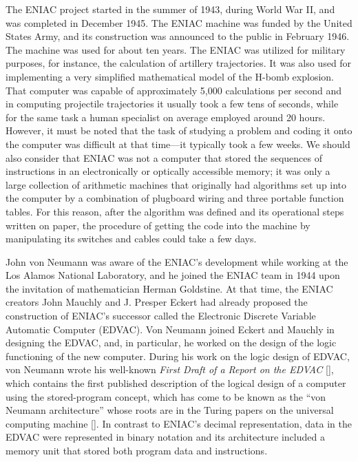 The ENIAC project started in the summer of 1943, during World War II, and was completed in December 1945. The ENIAC machine was funded by the United States Army, and its construction was announced to the public in February 1946. The machine was used for about ten years. The ENIAC was utilized for military purposes, for instance, the calculation of artillery trajectories. It was also used for implementing a very simplified mathematical model of the H-bomb explosion. That computer was capable of approximately 5,000 calculations per second and in computing projectile trajectories it usually took a few tens of seconds, while for the same task a human specialist on average employed around 20 hours. However, it must be noted that the task of studying a problem and coding it onto the computer was difficult at that time---it typically took a few weeks. We should also consider that ENIAC was not a computer that stored the sequences of instructions in an electronically or optically accessible memory; it was only a large collection of arithmetic machines that originally had algorithms set up into the computer by a combination of plugboard wiring and three portable function tables. For this reason, after the algorithm was defined and its operational steps written on paper, the procedure of getting the code into the machine by manipulating its switches and cables could take a few days.

John von Neumann was aware of the ENIAC's development while working at the Los Alamos National Laboratory, and he joined the ENIAC team in 1944 upon the invitation of mathematician Herman Goldstine. At that time, the ENIAC creators John Mauchly and J. Presper Eckert had already proposed the construction of ENIAC's successor called the Electronic Discrete Variable Automatic Computer (EDVAC). Von Neumann joined Eckert and Mauchly in designing the EDVAC, and, in particular, he worked on the design of the logic functioning of the new computer. During his work on the logic design of EDVAC, von Neumann wrote his well-known \textit{First Draft of a Report on the EDVAC} [\citealt{chap:02:Neumann:1945}], which contains the first published description of the logical design of a computer using the stored-program concept, which has come to be known as the ``von Neumann architecture'' whose roots are in the Turing papers on the universal computing machine [\citealt{chap:02:Turing:1937}]. In contrast to ENIAC's decimal representation, data in the EDVAC were represented in binary notation and its architecture included a memory unit that stored both program data and instructions.

